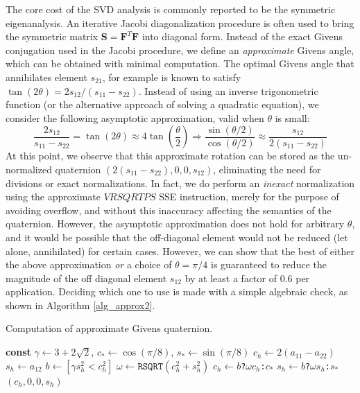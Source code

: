 The core cost of the SVD analysis is commonly reported to be the symmetric eigenanalysis. An iterative Jacobi diagonalization procedure is often used to bring the symmetric matrix
$\mathbf{S}=\mathbf{F}^T\mathbf{F}$ into diagonal form. Instead of the exact Givens conjugation used in the Jacobi procedure, we define an \emph{approximate} Givens angle, which can be obtained
with minimal computation. The optimal Givens angle that annihilates element $s_{21}$, for example is known to satisfy $\tan(2\theta)=2s_{12}/(s_{11}-s_{22})$. Instead of using an inverse
trigonometric function (or the alternative approach of solving a quadratic equation), we consider the following asymptotic approximation, valid when $\theta$ is small:
$$
\frac{2s_{12}}{s_{11}-s_{22}}=\tan(2\theta)\approx 4\tan(\frac{\theta}{2})\Rightarrow\frac{\sin(\theta/2)}{\cos(\theta/2)}\approx\frac{s_{12}}{2(s_{11}-s_{22})}
$$
At this point, we observe that this approximate rotation can be stored as the un-normalized quaternion $(2(s_{11}-s_{22}),0,0,s_{12})$, eliminating the need for divisions or exact
normalizations. In fact, we do perform an \emph{inexact} normalization using the approximate $VRSQRTPS$ SSE instruction, merely for the purpose of avoiding overflow, and without this
inaccuracy affecting the semantics of the quaternion. However, the asymptotic approximation does not hold for arbitrary $\theta$, and it would be possible that the off-diagonal element
would not be reduced (let alone, annihilated) for certain cases. However, we can show that the best of either the above approximation \emph{or} a choice of $\theta=\pi/4$ is guaranteed
to reduce the magnitude of the off diagonal element $s_{12}$ by at least a factor of $0.6$ per application. Deciding which one to use is made with a simple algebraic check, as shown in Algorithm \ref{alg_approx2}.
\begin{algorithm}[h]
\caption{Computation of approximate Givens quaternion.}
\label{alg_approx2}
\begin{algorithmic}[1]
\State \textbf{const} $\gamma\gets 3+2\sqrt{2}$, $c_\ast\gets \cos(\pi/8)$, $s_\ast\gets \sin(\pi/8)$
\State $c_h\gets 2(a_{11}\!-\!a_{22})$
\State $s_h\gets a_{12}$
\State $b\gets[\gamma s_h^2<c_h^2]$
\State $\omega\gets \texttt{RSQRT}(c_h^2+s_h^2)$
\State $c_h\gets b$\texttt{?}$\omega c_h$\texttt{:}$c_\ast$
\State $s_h\gets b$\texttt{?}$\omega s_h$\texttt{:}$s_\ast$
\State \Return $(c_h,0,0,s_h)$
\EndFunction
\end{algorithmic}
\end{algorithm}

